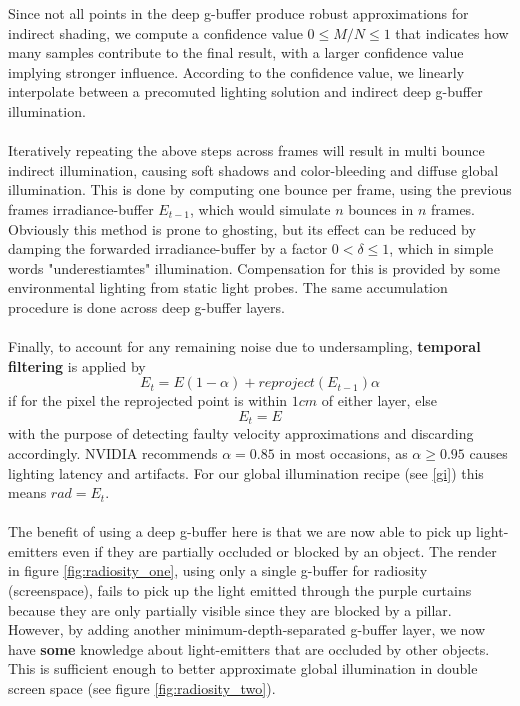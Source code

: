 \documentclass{ACGSeminar}
\begin{document}
		Since not all points in the deep g-buffer produce robust approximations for indirect shading, we compute a confidence value $0 \leq M/N \leq 1$ that indicates how many samples contribute to the final result, with a larger confidence value implying stronger influence. According to the confidence value, we linearly interpolate between a precomuted lighting solution and indirect deep g-buffer illumination. \\\\
		Iteratively repeating the above steps across frames will result in multi bounce indirect illumination, causing soft shadows and color-bleeding and diffuse global illumination. This is done by computing one bounce per frame, using the previous frames irradiance-buffer $E_{t-1}$, which would simulate $n$ bounces in $n$ frames. Obviously this method is prone to ghosting, but its effect can be reduced by damping the forwarded irradiance-buffer by a factor $0 < \delta \leq 1$, which in simple words "underestiamtes" illumination. Compensation for this is provided by some environmental lighting from static light probes. The same accumulation procedure is done across deep g-buffer layers. \\\\
		Finally, to account for any remaining noise due to undersampling, \textbf{temporal filtering} is applied by
		$$ E_t = E(1 - \alpha) + reproject(E_{t-1}) \alpha $$
		if for the pixel the reprojected point is within $1cm$ of either layer, else
		$$ E_t = E $$
		with the purpose of detecting faulty velocity approximations and discarding accordingly. NVIDIA recommends $\alpha = 0.85$ in most occasions, as $\alpha \geq 0.95$ causes lighting latency and artifacts. For our global illumination recipe (see \ref{gi}) this means $ rad = E_t$.
		\\\\
		The benefit of using a deep g-buffer here is that we are now able to pick up light-emitters even if they are partially occluded or blocked by an object. The render in figure \ref{fig:radiosity_one}, using only a single g-buffer for radiosity (screenspace), fails to pick up the light emitted through the purple curtains because they are only partially visible since they are blocked by a pillar. However, by adding another minimum-depth-separated g-buffer layer, we now have \textbf{some} knowledge about light-emitters that are occluded by other objects. This is sufficient enough to better approximate global illumination in double screen space (see figure \ref{fig:radiosity_two}).
\end{document}
